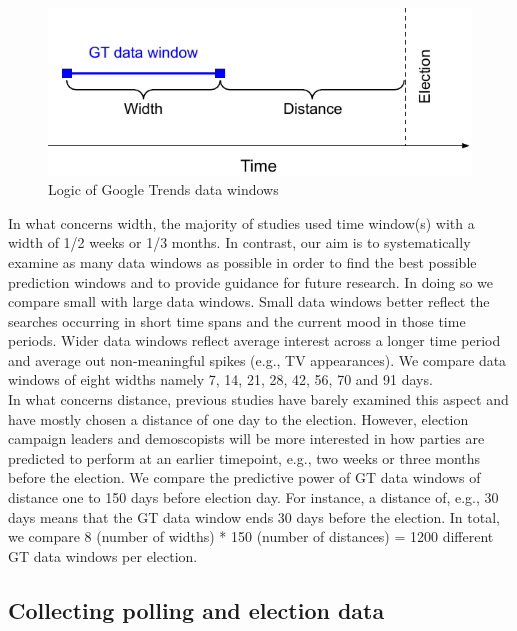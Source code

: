 \documentclass[
  letterpaper,
  DIV=11,
  numbers=noendperiod]{scrartcl}
\begin{document}
\begin{figure}[h]

\caption{\label{fig-2}Logic of Google Trends data windows}

{\centering \includegraphics{Figure_2_data_window_logic.pdf}

}

\end{figure}

In what concerns width, the majority of studies used time window(s) with
a width of 1/2 weeks or 1/3 months. In contrast, our aim is to
systematically examine as many data windows as possible in order to find
the best possible prediction windows and to provide guidance for future
research. In doing so we compare small with large data windows. Small
data windows better reflect the searches occurring in short time spans
and the current mood in those time periods. Wider data windows reflect
average interest across a longer time period and average out
non-meaningful spikes (e.g., TV appearances). We compare data windows of
eight widths namely 7, 14, 21, 28, 42, 56, 70 and 91 days.\\
In what concerns distance, previous studies have barely examined this
aspect and have mostly chosen a distance of one day to the election.
However, election campaign leaders and demoscopists will be more
interested in how parties are predicted to perform at an earlier
timepoint, e.g., two weeks or three months before the election. We
compare the predictive power of GT data windows of distance one to 150
days before election day. For instance, a distance of, e.g., 30 days
means that the GT data window ends 30 days before the election. In
total, we compare 8 (number of widths) * 150 (number of distances) =
1200 different GT data windows per election.

\hypertarget{sec-polldatacollection}{%
\subsection{Collecting polling and election
data}\label{sec-polldatacollection}}
\end{document}
